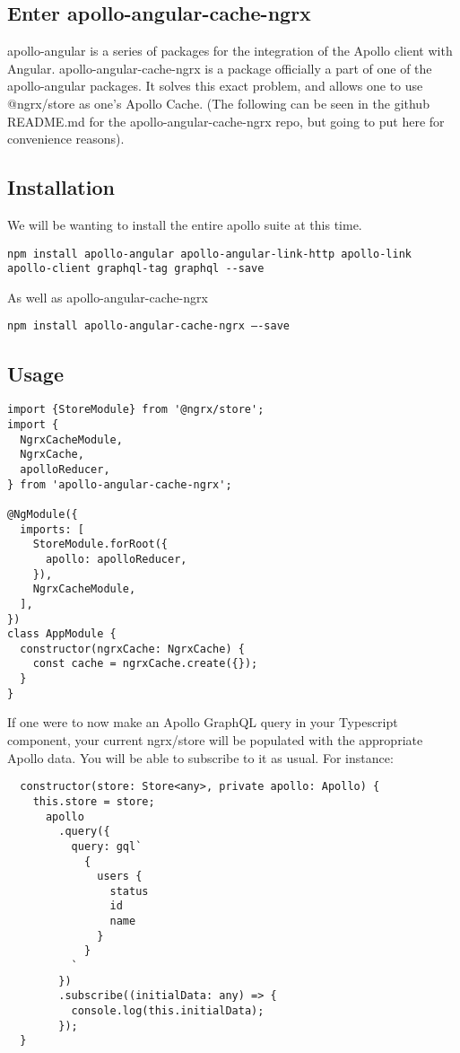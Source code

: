 \subsection{ Enter apollo-angular-cache-ngrx }
apollo-angular is a series of packages for the integration of the Apollo client
with Angular. apollo-angular-cache-ngrx is a package officially a part of one of
the apollo-angular packages. It solves this exact problem, and allows one to use
@ngrx/store as one’s Apollo Cache. (The following can be seen in the github
README.md for the apollo-angular-cache-ngrx repo, but going to put here for
convenience reasons).

\subsection{ Installation }
We will be wanting to install the entire apollo suite at this time.
\begin{lstlisting}
npm install apollo-angular apollo-angular-link-http apollo-link apollo-client graphql-tag graphql --save
\end{lstlisting}
As well as apollo-angular-cache-ngrx
\begin{lstlisting}
npm install apollo-angular-cache-ngrx —-save
\end{lstlisting}

\subsection{ Usage }
\begin{lstlisting}
import {StoreModule} from '@ngrx/store';
import {
  NgrxCacheModule,
  NgrxCache,
  apolloReducer,
} from 'apollo-angular-cache-ngrx';

@NgModule({
  imports: [
    StoreModule.forRoot({
      apollo: apolloReducer,
    }),
    NgrxCacheModule,
  ],
})
class AppModule {
  constructor(ngrxCache: NgrxCache) {
    const cache = ngrxCache.create({});
  }
}
\end{lstlisting}

If one were to now make an Apollo GraphQL query in your Typescript component,
your current ngrx/store will be populated with the appropriate Apollo data.
You will be able to subscribe to it as usual. For instance:
\begin{lstlisting}
  constructor(store: Store<any>, private apollo: Apollo) {
    this.store = store;
      apollo
        .query({
          query: gql`
            {
              users {
                status
                id
                name
              }
            }
          `
        })
        .subscribe((initialData: any) => {
          console.log(this.initialData);
        });
  }
\end{lstlisting}


